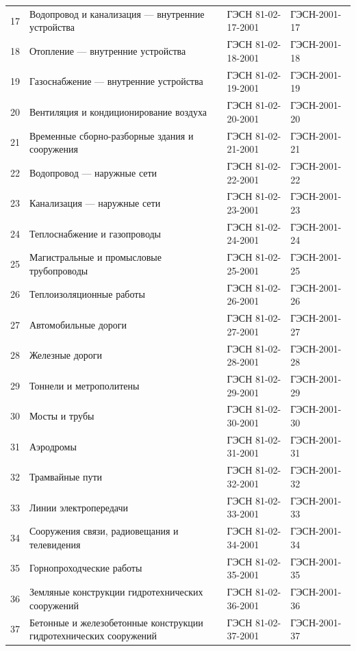 \begin{longtable}[!hbp]{l p{5cm} p{5cm} p{3cm}}
    17 	& Водопровод и канализация --- 
    внутренние устройства					& ГЭСН 81-02-17-2001 	& ГЭСН-2001-17\\ 
    18 	& Отопление --- внутренние устройства		& ГЭСН 81-02-18-2001 	& ГЭСН-2001-18\\ 
    19 	& Газоснабжение --- внутренние устройства	& ГЭСН 81-02-19-2001 	& ГЭСН-2001-19\\ 
    20 	& Вентиляция и кондиционирование воздуха	& ГЭСН 81-02-20-2001 	& ГЭСН-2001-20\\
    21 	& Временные сборно-разборные здания 
    и сооружения							& ГЭСН 81-02-21-2001 	& ГЭСН-2001-21\\ 
    22 	& Водопровод --- наружные сети				& ГЭСН 81-02-22-2001 	& ГЭСН-2001-22\\ 
    23 	& Канализация --- наружные сети				& ГЭСН 81-02-23-2001 	& ГЭСН-2001-23\\ 
    24 	& Теплоснабжение и газопроводы				& ГЭСН 81-02-24-2001 	& ГЭСН-2001-24\\ 
    25 	& Магистральные и промысловые трубопроводы	& ГЭСН 81-02-25-2001 	& ГЭСН-2001-25\\ 
    26 	& Теплоизоляционные работы					& ГЭСН 81-02-26-2001 	& ГЭСН-2001-26\\ 
    27 	& Автомобильные дороги						& ГЭСН 81-02-27-2001 	& ГЭСН-2001-27\\ 
    28 	& Железные дороги							& ГЭСН 81-02-28-2001 	& ГЭСН-2001-28\\ 
    29 	& Тоннели и метрополитены					& ГЭСН 81-02-29-2001 	& ГЭСН-2001-29\\ 
    30 	& Мосты и трубы								& ГЭСН 81-02-30-2001 	& ГЭСН-2001-30\\ 
    31 	& Аэродромы									& ГЭСН 81-02-31-2001 	& ГЭСН-2001-31\\ 
    32 	& Трамвайные пути							& ГЭСН 81-02-32-2001 	& ГЭСН-2001-32\\ 
    33 	& Линии электропередачи						& ГЭСН 81-02-33-2001 	& ГЭСН-2001-33\\ 
    34 	& Сооружения связи, радиовещания 
    и телевидения							& ГЭСН 81-02-34-2001 	& ГЭСН-2001-34\\ 
    35 	& Горнопроходческие работы					& ГЭСН 81-02-35-2001 	& ГЭСН-2001-35\\ 
    36 	& Земляные конструкции гидротехнических 
    сооружений								& ГЭСН 81-02-36-2001 	& ГЭСН-2001-36\\ 
    37 	& Бетонные и железобетонные конструкции 
    гидротехнических сооружений				& ГЭСН 81-02-37-2001 	& ГЭСН-2001-37\\ 

\end{longtable}

